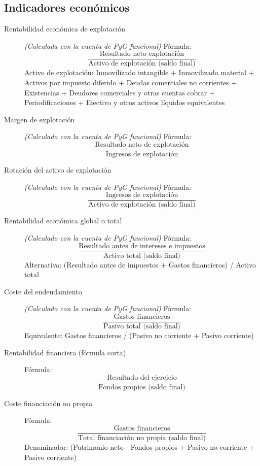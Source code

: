 \documentclass[12pt]{book} %
\begin{document}
\subsection*{Indicadores económicos}
\begin{description}
\item[Rentabilidad económica de explotación]
\textit{(Calculada con la cuenta de PyG funcional)}
Fórmula: $$\displaystyle \frac{\text{Resultado neto explotación}}{\text{Activo de explotación (saldo final)}}$$
Activo de explotación: Inmovilizado intangible + Inmovilizado material + Activos por impuesto diferido + Deudas comerciales no corrientes + Existencias + Deudores comerciales y otras cuentas cobrar + Periodificaciones + Efectivo y otros activos líquidos equivalentes

\item[Margen de explotación]
\textit{(Calculado con la cuenta de PyG funcional)}
Fórmula: $$\displaystyle \frac{\text{Resultado neto de explotación}}{\text{Ingresos de explotación}}$$

\item[Rotación del activo de explotación]
\textit{(Calculado con la cuenta de PyG funcional)}
Fórmula: $$\displaystyle \frac{\text{Ingresos de explotación}}{\text{Activo de explotación (saldo final)}}$$

\item[Rentabilidad económica global o total]
\textit{(Calculado con la cuenta de PyG funcional)}
Fórmula: $$\displaystyle \frac{\text{Resultado antes de intereses e impuestos}}{\text{Activo total (saldo final)}}$$
Alternativa: (Resultado antes de impuestos + Gastos financieros) / Activo total

\item[Coste del endeudamiento]
\textit{(Calculado con la cuenta de PyG funcional)}
Fórmula: $$\displaystyle \frac{\text{Gastos financieros}}{\text{Pasivo total (saldo final)}}$$
Equivalente: Gastos financieros / (Pasivo no corriente + Pasivo corriente)

\item[Rentabilidad financiera (fórmula corta)]
Fórmula: $$\displaystyle \frac{\text{Resultado del ejercicio}}{\text{Fondos propios (saldo final)}}$$

\item[Coste financiación no propia]
Fórmula: $$\displaystyle \frac{\text{Gastos financieros}}{\text{Total financiación no propia (saldo final)}}$$
Denominador: (Patrimonio neto - Fondos propios + Pasivo no corriente + Pasivo corriente)


\end{description}
\end{document}
